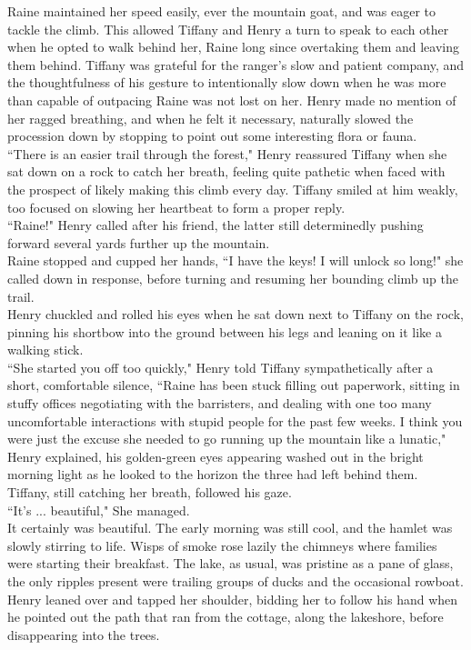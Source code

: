 Raine maintained her speed easily, ever the mountain goat, and was eager to tackle the climb.
This allowed Tiffany and Henry a turn to speak to each other when he opted to walk behind her, Raine long since overtaking them and leaving them behind.
Tiffany was grateful for the ranger's slow and patient company, and the thoughtfulness of his gesture to intentionally slow down when he was more than capable of outpacing Raine was not lost on her.
Henry made no mention of her ragged breathing, and when he felt it necessary, naturally slowed the procession down by stopping to point out some interesting flora or fauna.\\

``There is an easier trail through the forest," Henry reassured Tiffany when she sat down on a rock to catch her breath, feeling quite pathetic when faced with the prospect of likely making this climb every day.
Tiffany smiled at him weakly, too focused on slowing her heartbeat to form a proper reply.\\
``Raine!" Henry called after his friend, the latter still determinedly pushing forward several yards further up the mountain.\\
Raine stopped and cupped her hands, ``I have the keys! I will unlock so long!" she called down in response, before turning and resuming her bounding climb up the trail.\\
Henry chuckled and rolled his eyes when he sat down next to Tiffany on the rock, pinning his shortbow into the ground between his legs and leaning on it like a walking stick.\\

``She started you off too quickly," Henry told Tiffany sympathetically after a short, comfortable silence, ``Raine has been stuck filling out paperwork, sitting in stuffy offices negotiating with the barristers, and dealing with one too many uncomfortable interactions with stupid people for the past few weeks. I think you were just the excuse she needed to go running up the mountain like a lunatic," Henry explained, his golden-green eyes appearing washed out in the bright morning light as he looked to the horizon the three had left behind them.\\
Tiffany, still catching her breath, followed his gaze.\\
``It's ... beautiful," She managed.\\
It certainly was beautiful.
The early morning was still cool, and the hamlet was slowly stirring to life.
Wisps of smoke rose lazily the chimneys where families were starting their breakfast.
The lake, as usual, was pristine as a pane of glass, the only ripples present were trailing groups of ducks and the occasional rowboat.
Henry leaned over and tapped her shoulder, bidding her to follow his hand when he pointed out the path that ran from the cottage, along the lakeshore, before disappearing into the trees.\\

